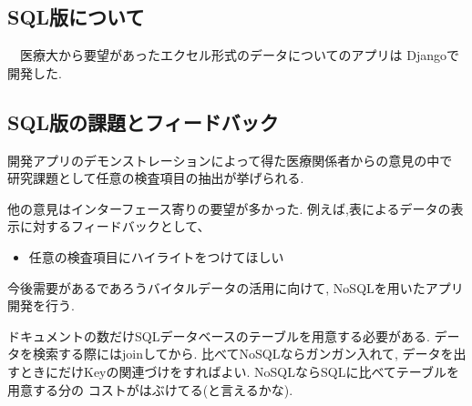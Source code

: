 \subsection{SQL版について}
　医療大から要望があったエクセル形式のデータについてのアプリは
  Djangoで開発した.


\subsection{SQL版の課題とフィードバック}

  開発アプリのデモンストレーションによって得た医療関係者からの意見の中で
  研究課題として任意の検査項目の抽出が挙げられる.

  他の意見はインターフェース寄りの要望が多かった.
  例えば,表によるデータの表示に対するフィードバックとして、

  \begin{itemize}
    \item 任意の検査項目にハイライトをつけてほしい
  \end{itemize}


  今後需要があるであろうバイタルデータの活用に向けて,
  NoSQLを用いたアプリ開発を行う.

  ドキュメントの数だけSQLデータベースのテーブルを用意する必要がある.
  データを検索する際にはjoinしてから.
  比べてNoSQLならガンガン入れて,
  データを出すときにだけKeyの関連づけをすればよい.
  NoSQLならSQLに比べてテーブルを用意する分の
  コストがはぶけてる(と言えるかな).
